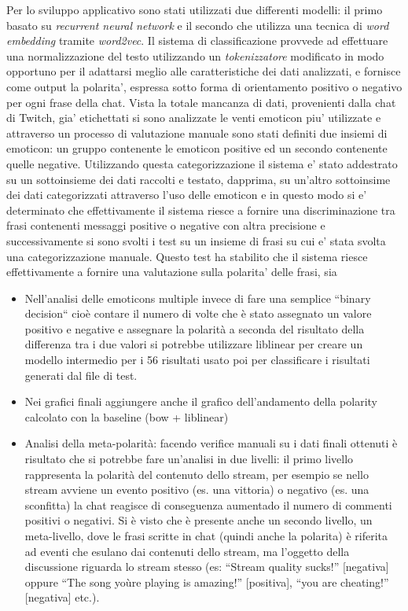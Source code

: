 \documentclass[a4paper,12pt,openright,twoside]{report}
\theoremstyle{definition}
\begin{document}
Per lo sviluppo applicativo sono stati utilizzati due differenti modelli: il primo basato su 
\emph{recurrent neural network} e il secondo che utilizza una tecnica di \emph{word embedding}
tramite \emph{word2vec}.
Il sistema di classificazione provvede ad effettuare una normalizzazione del testo utilizzando
un \emph{tokenizzatore} modificato in modo opportuno per il adattarsi meglio alle caratteristiche
dei dati analizzati, e fornisce come output la polarita', espressa sotto forma di orientamento
positivo o negativo per ogni frase della chat.
Vista la totale mancanza di dati, provenienti dalla chat di Twitch, gia' etichettati si
sono analizzate le venti emoticon piu' utilizzate e attraverso un processo di valutazione
manuale sono stati definiti due insiemi di emoticon: un gruppo contenente le emoticon positive
ed un secondo contenente quelle negative.
Utilizzando questa categorizzazione il sistema e' stato addestrato su un sottoinsieme dei dati
raccolti e testato, dapprima, su un'altro sottoinsime dei dati categorizzati attraverso l'uso
delle emoticon e in questo modo si e' determinato che effettivamente il sistema riesce a 
fornire una discriminazione tra frasi contenenti messaggi positive o negative con altra precisione
e successivamente si sono svolti i test su un insieme di frasi su cui e' stata svolta
una categorizzazione manuale.
Questo test ha stabilito che il sistema riesce effettivamente a fornire una valutazione sulla
polarita' delle frasi, sia 

\begin{itemize}
\item Nell'analisi delle emoticons multiple invece di fare una semplice ``binary decision`` cioè contare il numero di volte che è stato assegnato un valore positivo e negative e assegnare la polarità a seconda del risultato della differenza tra i due valori si potrebbe utilizzare liblinear per creare un modello intermedio per i 56 risultati usato poi per classificare i risultati generati dal file di test.
\item Nei grafici finali aggiungere anche il grafico dell'andamento della polarity calcolato con la baseline (bow + liblinear)
\item Analisi della meta-polarità: facendo verifice manuali su i dati finali ottenuti è risultato che si potrebbe fare un'analisi in due livelli: il primo livello rappresenta la polarità del contenuto dello stream, per esempio se nello stream avviene un evento positivo (es. una vittoria) o negativo (es. una sconfitta) la chat reagisce di conseguenza aumentado il numero di commenti positivi o negativi.
Si è visto che è presente anche un secondo livello, un meta-livello, dove le frasi scritte in chat (quindi anche la polarita) è riferita ad eventi che esulano dai contenuti dello stream, ma l'oggetto della discussione riguarda lo stream stesso (es: ``Stream quality sucks!'' [negativa] oppure ``The song yoùre playing is amazing!'' [positiva], ``you are cheating!'' [negativa] etc.).
\end{itemize}



\end{document}
